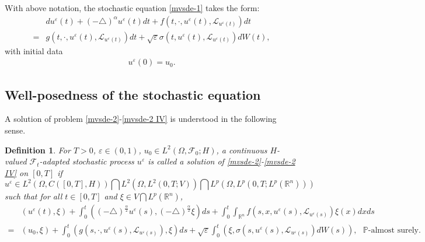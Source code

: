 \documentclass[11pt]{article}
\numberwithin{equation}{section}
\theoremstyle{plain}
\newtheorem{definition}{Definition}[section]
\begin{document}
With above notation,
the stochastic  equation \eqref{mvsde-1}
takes the  form:
\begin{align}\label{mvsde-2}
      & d u^\varepsilon(t) + (-\triangle)^\alpha u^\varepsilon(t) dt
         + f(t, \cdot,  u^\varepsilon (t), \mathcal{L}_{u^\varepsilon (t)} )
         dt \nonumber \\
    = & g(t, \cdot, u^\varepsilon (t), \mathcal{L}_{u^\varepsilon (t)} ) dt
        + \sqrt{\varepsilon}
                  \sigma(t, u^\varepsilon (t), \mathcal{L}_{u^\varepsilon (t)} ) dW(t),
\end{align}
with initial data
\begin{align} \label{mvsde-2 IV}
    u^\varepsilon(0) = u_0.
\end{align}



\subsection{Well-posedness of the stochastic equation}

A solution of
problem
\eqref{mvsde-2}-\eqref{mvsde-2 IV}
is understood in the following sense.



\begin{definition} \label{defsol}
  For $T>0$, $\varepsilon \in (0,1)$,
  $u_0 \in L^2(\Omega, \mathscr{F}_0; H)$,
 a continuous $H$-valued $\mathscr{F}_t$-adapted stochastic process $u^\varepsilon$ is called a
 solution of \eqref{mvsde-2}-\eqref{mvsde-2 IV} on $[0,T]$ if
 $$ u^\varepsilon
    \in L^2(\Omega, C([0,T], H) )
        \bigcap
        L^2(\Omega, L^2(0,T; V) )
        \bigcap
        L^p(\Omega, L^p(0,T; L^p(\mathbb{R}^n ) ) )
 $$
 such that for all $t \in [0,T]$ and $\xi \in V \bigcap L^p(\mathbb{R}^n)$,
 \begin{align*}
    & (u^\varepsilon (t), \xi)
      + \int_0^t
                 \left( (-\triangle)^{\frac{\alpha}{2}} u^\varepsilon(s),
                        (-\triangle)^{\frac{\alpha}{2}} \xi
                 \right) ds
      + \int_0^t \int_{\mathbb{R} ^n}  f( s, x, u^\varepsilon (s), \mathcal{L}_{u^\varepsilon (s)} ) \xi(x) dx ds
           \nonumber \\
  = & (u_0, \xi)
      + \int_0^t \left( g(s, \cdot, u^\varepsilon (s), \mathcal{L}_{u^\varepsilon (s)} ), \xi \right) ds
      + \sqrt{\varepsilon} \int_0^t
                                   \left( \xi, \sigma(s, u^\varepsilon(s), \mathcal{L}_{u^\varepsilon (s)} ) dW(s)
                                   \right),
                                   \ \ \   \mathbb{P} \text{-almost surely}.
 \end{align*}
\end{definition}
\end{document}

